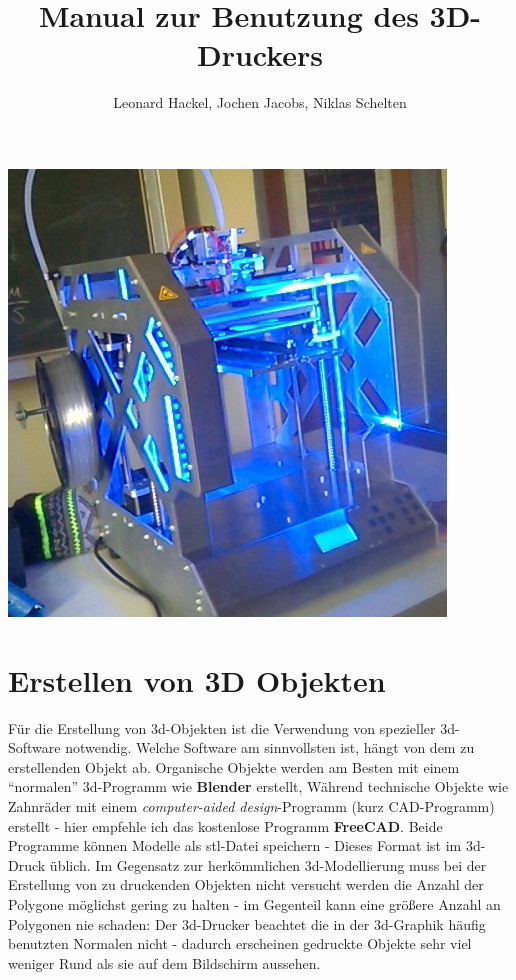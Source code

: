 \documentclass[11pt,a4paper]{scrartcl}
\author{Leonard Hackel, Jochen Jacobs, Niklas Schelten}
\title{Manual zur Benutzung des 3D-Druckers}
\begin{document}
\maketitle
\begin{center}
\includegraphics[scale=0.75]{res/31_1.jpg}
\end{center}
\pagebreak
\tableofcontents
\vspace{11pt}
\section{Erstellen von 3D Objekten}
Für die Erstellung von 3d-Objekten ist die Verwendung von spezieller 3d-Software notwendig. Welche Software am sinnvollsten ist, hängt von dem zu erstellenden Objekt ab. Organische Objekte werden am Besten mit einem \enquote{normalen} 3d-Programm wie \textbf{Blender} erstellt, Während technische Objekte wie Zahnräder mit einem \textit{computer-aided design}-Programm (kurz CAD-Programm) erstellt - hier empfehle ich das kostenlose Programm \textbf{FreeCAD}. Beide Programme können Modelle als stl-Datei speichern - Dieses Format ist im 3d-Druck üblich. Im Gegensatz zur herkömmlichen 3d-Modellierung muss bei der Erstellung von zu druckenden Objekten nicht versucht werden die Anzahl der Polygone möglichst gering zu halten - im Gegenteil kann eine größere Anzahl an Polygonen nie schaden: Der 3d-Drucker beachtet die in der 3d-Graphik häufig benutzten Normalen nicht - dadurch erscheinen gedruckte Objekte sehr viel weniger Rund als sie auf dem Bildschirm aussehen.
\end{document}
